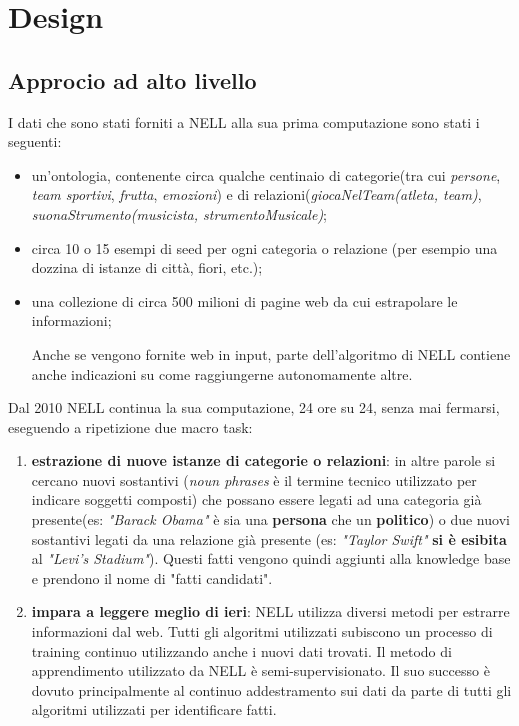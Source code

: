 \section{Design}
\subsection{Approcio ad alto livello}

I dati che sono stati forniti a NELL alla sua prima computazione sono stati i seguenti:
\begin{itemize}
    \item un'ontologia, contenente circa qualche centinaio di categorie(tra cui \textit{persone}, \textit{team sportivi}, \textit{frutta}, \textit{emozioni}) e di relazioni(\textit{giocaNelTeam(atleta, team)}, \textit{suonaStrumento(musicista, strumentoMusicale)};
    \item circa 10 o 15 esempi di seed per ogni categoria o relazione (per esempio una dozzina di istanze di città, fiori, etc.);
    \item una collezione di circa 500 milioni di pagine web da cui estrapolare le informazioni;
    \begin{info}
        Anche se vengono fornite web in input, parte dell'algoritmo di NELL contiene anche indicazioni su come raggiungerne autonomamente altre.
    \end{info}
\end{itemize}

\noindent Dal 2010 NELL continua la sua computazione, 24 ore su 24, senza mai fermarsi, eseguendo a ripetizione due macro task:
\begin{enumerate}
    \item \textbf{estrazione di nuove istanze di categorie o relazioni}: in altre parole si cercano nuovi sostantivi (\textit{noun phrases} è il termine tecnico utilizzato per indicare soggetti composti) che possano essere legati ad una categoria già presente(es: \textit{"Barack Obama"} è sia una \textbf{persona} che un \textbf{politico}) o due nuovi sostantivi legati da una relazione già presente (es: \textit{"Taylor Swift"} \textbf{si è esibita} al \textit{"Levi's Stadium"}). Questi fatti vengono quindi aggiunti alla knowledge base e prendono il nome di "fatti candidati".
    \item \textbf{impara a leggere meglio di ieri}: NELL utilizza diversi metodi per estrarre informazioni dal web. Tutti gli algoritmi utilizzati subiscono un processo di training continuo utilizzando anche i nuovi dati trovati. Il metodo di apprendimento utilizzato da NELL è semi-supervisionato. Il suo successo è dovuto principalmente al continuo addestramento sui dati da parte di tutti gli algoritmi utilizzati per identificare fatti\cite{ReadtheWebOverview:online}.
\end{enumerate}

